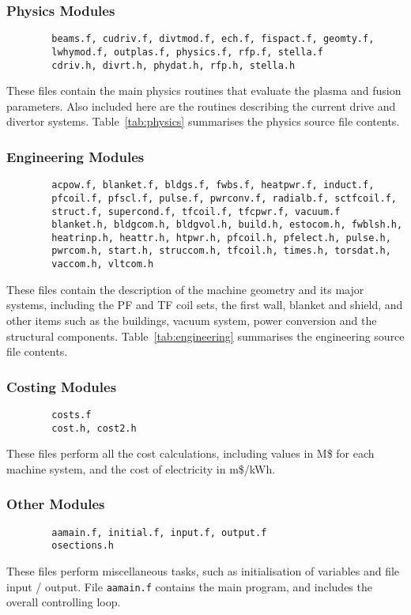 {\subsubsection{Physics Modules}
\begin{verbatim}
        beams.f, cudriv.f, divtmod.f, ech.f, fispact.f, geomty.f,
        lwhymod.f, outplas.f, physics.f, rfp.f, stella.f
        cdriv.h, divrt.h, phydat.h, rfp.h, stella.h
\end{verbatim}
These files contain the main physics routines that evaluate the plasma and
fusion parameters. Also included here are the routines describing the current
drive and divertor systems. Table~\ref{tab:physics} summarises the physics
source file contents.

\subsubsection{Engineering Modules}
\begin{verbatim}
        acpow.f, blanket.f, bldgs.f, fwbs.f, heatpwr.f, induct.f,
        pfcoil.f, pfscl.f, pulse.f, pwrconv.f, radialb.f, sctfcoil.f,
        struct.f, supercond.f, tfcoil.f, tfcpwr.f, vacuum.f
        blanket.h, bldgcom.h, bldgvol.h, build.h, estocom.h, fwblsh.h,
        heatrinp.h, heattr.h, htpwr.h, pfcoil.h, pfelect.h, pulse.h,
        pwrcom.h, start.h, struccom.h, tfcoil.h, times.h, torsdat.h,
        vaccom.h, vltcom.h
\end{verbatim}
These files contain the description of the machine geometry and its major
systems, including the PF and TF coil sets, the first wall, blanket and
shield, and other items such as the buildings, vacuum system, power conversion
and the structural components.  Table~\ref{tab:engineering} summarises the
engineering source file contents.

\subsubsection{Costing Modules}
\begin{verbatim}
        costs.f
        cost.h, cost2.h
\end{verbatim}
These files perform all the cost calculations, including values in M\$ for
each machine system, and the cost of electricity in m\$/kWh.

\subsubsection{Other Modules}
\begin{verbatim}
        aamain.f, initial.f, input.f, output.f
        osections.h
\end{verbatim}
These files perform miscellaneous tasks, such as initialisation of variables
and file input / output. File {\tt aamain.f} contains the main program, and
includes the overall controlling loop.

}
